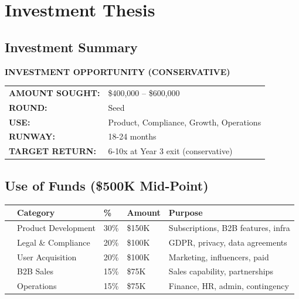 \documentclass[11pt,a4paper]{article}
\begin{document}
\newpage

\section{Investment Thesis}

\subsection{Investment Summary}

\begin{keymetricbox}
\begin{center}
{\Large\bfseries INVESTMENT OPPORTUNITY (CONSERVATIVE)}\\[20pt]
\begin{tabular}{ll}
    \textbf{AMOUNT SOUGHT:} & \$400,000 -- \$600,000\\[8pt]
    \textbf{ROUND:} & Seed\\[8pt]
    \textbf{USE:} & Product, Compliance, Growth, Operations\\[8pt]
    \textbf{RUNWAY:} & 18-24 months\\[8pt]
    \textbf{TARGET RETURN:} & 6-10x at Year 3 exit (conservative)\\
\end{tabular}
\end{center}
\end{keymetricbox}

\subsection{Use of Funds (\$500K Mid-Point)}

\begin{center}
\begin{tabular}{C{1cm} L{4cm} C{1.5cm} R{2cm} L{4.5cm}}
    \toprule
    & \textbf{Category} & \textbf{\%} & \textbf{Amount} & \textbf{Purpose}\\
    \midrule
     & Product Development & 30\% & \$150K & Subscriptions, B2B features, infra\\
     & Legal \& Compliance & 20\% & \$100K & GDPR, privacy, data agreements\\
     & User Acquisition & 20\% & \$100K & Marketing, influencers, paid\\
     & B2B Sales & 15\% & \$75K & Sales capability, partnerships\\
     & Operations & 15\% & \$75K & Finance, HR, admin, contingency\\
    \bottomrule
\end{tabular}
\end{center}
\end{document}
